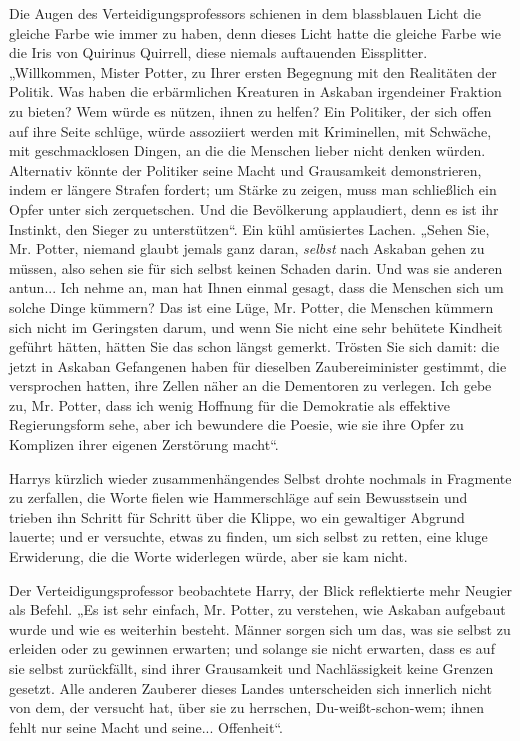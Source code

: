 {Die Augen des Verteidigungsprofessors schienen in dem blassblauen Licht die gleiche Farbe wie immer zu haben, denn dieses Licht hatte die gleiche Farbe wie die Iris von Quirinus Quirrell, diese niemals auftauenden Eissplitter. „Willkommen, Mister Potter, zu Ihrer ersten Begegnung mit den Realitäten der Politik. Was haben die erbärmlichen Kreaturen in Askaban irgendeiner Fraktion zu bieten? Wem würde es nützen, ihnen zu helfen? Ein Politiker, der sich offen auf ihre Seite schlüge, würde assoziiert werden mit Kriminellen, mit Schwäche, mit geschmacklosen Dingen, an die die Menschen lieber nicht denken würden. Alternativ könnte der Politiker seine Macht und Grausamkeit demonstrieren, indem er längere Strafen fordert; um Stärke zu zeigen, muss man schließlich ein Opfer unter sich zerquetschen. Und die Bevölkerung applaudiert, denn es ist ihr Instinkt, den Sieger zu unterstützen“. Ein kühl amüsiertes Lachen. „Sehen Sie, Mr. Potter, niemand glaubt jemals ganz daran, \emph{selbst} nach Askaban gehen zu müssen, also sehen sie für sich selbst keinen Schaden darin. Und was sie anderen antun... Ich nehme an, man hat Ihnen einmal gesagt, dass die Menschen sich um solche Dinge kümmern? Das ist eine Lüge, Mr. Potter, die Menschen kümmern sich nicht im Geringsten darum, und wenn Sie nicht eine sehr behütete Kindheit geführt hätten, hätten Sie das schon längst gemerkt. Trösten Sie sich damit: die jetzt in Askaban Gefangenen haben für dieselben Zaubereiminister gestimmt, die versprochen hatten, ihre Zellen näher an die Dementoren zu verlegen. Ich gebe zu, Mr. Potter, dass ich wenig Hoffnung für die Demokratie als effektive Regierungsform sehe, aber ich bewundere die Poesie, wie sie ihre Opfer zu Komplizen ihrer eigenen Zerstörung macht“.

Harrys kürzlich wieder zusammenhängendes Selbst drohte nochmals in Fragmente zu zerfallen, die Worte fielen wie Hammerschläge auf sein Bewusstsein und trieben ihn Schritt für Schritt über die Klippe, wo ein gewaltiger Abgrund lauerte; und er versuchte, etwas zu finden, um sich selbst zu retten, eine kluge Erwiderung, die die Worte widerlegen würde, aber sie kam nicht.

Der Verteidigungsprofessor beobachtete Harry, der Blick reflektierte mehr Neugier als Befehl. „Es ist sehr einfach, Mr. Potter, zu verstehen, wie Askaban aufgebaut wurde und wie es weiterhin besteht. Männer sorgen sich um das, was sie selbst zu erleiden oder zu gewinnen erwarten; und solange sie nicht erwarten, dass es auf sie selbst zurückfällt, sind ihrer Grausamkeit und Nachlässigkeit keine Grenzen gesetzt. Alle anderen Zauberer dieses Landes unterscheiden sich innerlich nicht von dem, der versucht hat, über sie zu herrschen, Du-weißt-schon-wem; ihnen fehlt nur seine Macht und seine... Offenheit“.

}
